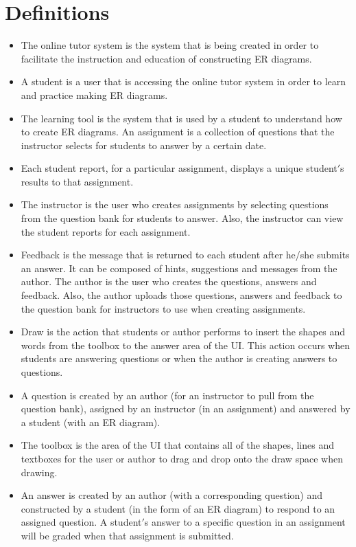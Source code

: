\chapter{Definitions}
\begin{itemize}
\item The online tutor system is the system that is being created in order to facilitate the instruction and education of constructing ER diagrams.
\item A student is a user that is accessing the online tutor system in order to learn and practice making ER diagrams.
\item The learning tool is the system that is used by a student to understand how to create ER diagrams.
An assignment is a collection of questions that the instructor selects for students to answer by a certain date.
\item Each student report, for a particular assignment, displays a unique student$'$s results to that assignment.
\item The instructor is the user who creates assignments by selecting questions from the question bank for students to answer. Also, the instructor can view the student reports for each assignment.
\item Feedback is the message that is returned to each student after he/she submits an answer. It can be composed of hints, suggestions and messages from the author.
The author is the user who creates the questions, answers and feedback. Also, the author uploads those questions, answers and feedback to the question bank for instructors to use when creating assignments.
\item Draw is the action that students or author performs to insert the shapes and words from the toolbox to the answer area of the UI. This action occurs when students are answering questions or when the author is creating answers to questions.
\item A question is created by an author (for an instructor to pull from the question bank), assigned by an instructor (in an assignment) and answered by a student (with an ER diagram).
\item  The toolbox is the area of the UI that contains all of the shapes, lines and textboxes for the user or author to drag and drop onto the draw space when drawing.
\item An answer is created by an author (with a corresponding question) and constructed by a student (in the form of an ER diagram) to respond to an assigned question. A student$'$s answer to a specific question in an assignment will be graded when that assignment is submitted.

\end{itemize}
